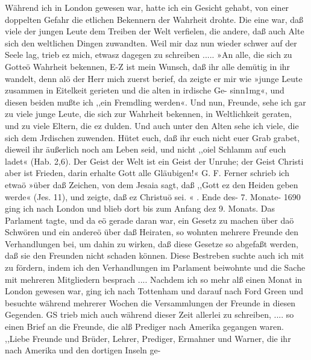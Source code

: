 Während ich in London gewesen war, hatte ich ein Gesicht
gehabt, von einer doppelten Gefahr die etlichen Bekennern der
Wahrheit drohte. Die eine war, daß viele der jungen Leute dem
Treiben der Welt verfielen, die andere, daß auch Alte sich den
weltlichen Dingen zuwandten. Weil mir daz nun wieder schwer
auf der Seele lag, trieb ez mich, etwasz dagegen zu schreiben .....
»An alle, die sich zu Gotteö Wahrheit bekennen,
E-Z ist mein Wunsch, daß ihr alle demütig in ihr wandelt,
denn alö der Herr mich zuerst berief, da zeigte er mir wie »junge
Leute zusammen in Eitelkeit gerieten und die alten in irdische Ge-
sinn1mg«, und diesen beiden mußte ich ,,ein Fremdling werden«.
Und nun, Freunde, sehe ich gar zu viele junge Leute, die sich
zur Wahrheit bekennen, in Weltlichkeit geraten, und zu viele
Eltern, die ez dulden. Und auch unter den Alten sehe ich viele,
die sich dem Jrdischen zuwenden. Hütet euch, daß ihr euch nicht
euer Grab grabet, dieweil ihr äußerlich noch am Leben seid, und
nicht ,,oiel Schlamm auf euch ladet« (Hab. 2,6). Der Geist der
Welt ist ein Geist der Unruhe; der Geist Christi aber ist Frieden,
darin erhalte Gott alle Gläubigen!« G. F.
Ferner schrieb ich etwaö »über daß Zeichen, von dem Jesaia
sagt, daß ,,Gott ez den Heiden geben werde« (Jes. 11), und zeigte,
daß ez Christuö sei. « .
Ende des- 7. Monate- 1690 ging ich nach London und blieb
dort bis zum Anfang dez 9. Monats. Das Parlament tagte, und
da eö gerade daran war, ein Gesetz zu machen über daö Schwören
und ein andereö über daß Heiraten, so wohnten mehrere Freunde
den Verhandlungen bei, um dahin zu wirken, daß diese Gesetze
so abgefaßt werden, daß sie den Freunden nicht schaden können.
Diese Bestreben suchte auch ich mit zu fördern, indem ich den
Verhandlungen im Parlament beiwohnte und die Sache mit
mehreren Mitgliedern besprach ....
Nachdem ich so mehr alß einen Monat in London gewesen
war, ging ich nach Tottenham und darauf nach Ford Green
und besuchte während mehrerer Wochen die Versammlungen
der Freunde in diesen Gegenden. GS trieb mich auch während
dieser Zeit allerlei zu schreiben, .... so einen Brief an die
Freunde, die alß Prediger nach Amerika gegangen waren.
,,Liebe Freunde und Brüder, Lehrer, Prediger, Ermahner
und Warner, die ihr nach Amerika und den dortigen Inseln ge-


